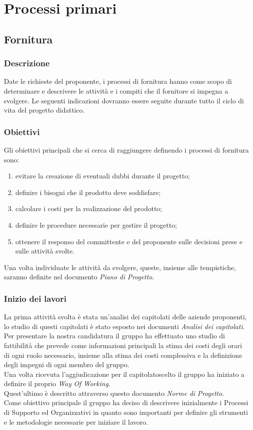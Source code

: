 \section{Processi primari} 

\subsection{Fornitura} 
\subsubsection{Descrizione}
Date le richieste del proponente, i processi di fornitura hanno come scopo di determinare e descrivere le attività e i compiti che il fornitore si impegna a svolgere.
Le seguenti indicazioni dovranno essere seguite durante tutto il ciclo di vita del progetto didattico.

\subsubsection{Obiettivi} 
Gli obiettivi principali che si cerca di raggiungere definendo i processi di fornitura sono: 
\begin{enumerate}
    \item evitare la creazione di eventuali dubbi durante il progetto; 
    \item definire i bisogni che il prodotto deve soddisfare; 
    \item calcolare i costi per la realizzazione del prodotto; 
    \item definire le procedure necessarie per gestire il progetto; 
    \item ottenere il responso del committente e del proponente sulle decisioni prese e sulle attività svolte.
\end{enumerate}
Una volta individuate le attività da svolgere, queste, insieme alle tempistiche, 
saranno definite nel documento \textit{Piano di Progetto}.


\subsubsection{Inizio dei lavori} 
La prima attività svolta è stata un'analisi dei capitolati delle aziende proponenti, lo studio di questi capitolati è stato esposto nei documenti \textit{Analisi dei capitolati}. \\
Per presentare la nostra candidatura il gruppo ha effettuato uno studio di fattibilità che 
prevede come informazioni principali la stima dei costi degli orari di ogni ruolo necessario, 
insieme alla stima dei costi complessiva e la definizione degli impegni di ogni membro del gruppo. \\
Una volta ricevuta l'aggiudicazione per il capitolato\glo scelto il gruppo ha iniziato a definire il proprio \textit{Way Of Working}. \\
Quest'ultimo è descritto attraverso questo documento \textit{Norme di Progetto}. \\
Come obiettivo principale il gruppo ha deciso di descrivere inizialmente i Processi di Supporto ed Organizzativi in quanto sono 
importanti per definire gli strumenti e le metodologie necessarie per iniziare il lavoro. 


